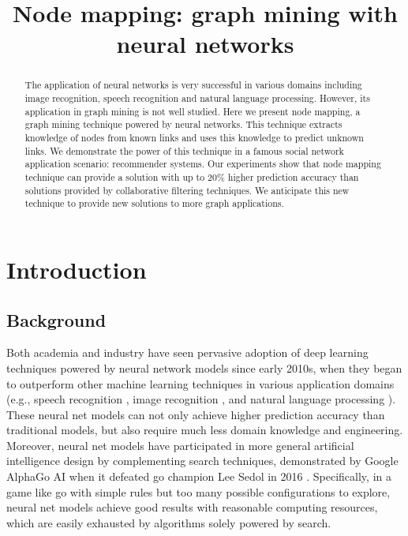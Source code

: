 \documentclass[twocolumn]{article}
\begin{document}
\lstset{language=python, tabsize=4}
\title{Node mapping: graph mining with neural networks}
\maketitle

\begin{abstract}
	The application of neural networks is very successful in various domains 
	including image recognition, speech recognition and natural language 
	processing.
	However, its application in graph mining is not well studied.
	Here we present node mapping, a graph mining technique powered by neural 
	networks.
	This technique extracts knowledge of nodes from known links and uses this 
	knowledge to predict unknown links.
	We demonstrate the power of this technique in a famous social network 
	application scenario: recommender systems.
	Our experiments show that node mapping technique can provide a 
	solution with up to 20\% higher prediction accuracy than solutions provided 
	by collaborative filtering techniques.
	We anticipate this new technique to provide new solutions to more graph 
	applications.
\end{abstract}

\section{Introduction}

\subsection{Background}
Both academia and industry have seen pervasive adoption of deep learning 
techniques powered by neural network models since early 2010s,
when they began to outperform other machine learning techniques in various 
application domains (e.g., speech recognition \cite{hannun2014deep}, image 
recognition \cite{simonyan2014very}, and natural language processing 
\cite{yao2013recurrent}).
These neural net models can not only achieve higher prediction accuracy than 
traditional models,
but also require much less domain knowledge and engineering.
Moreover, neural net models have participated in more general artificial 
intelligence design by complementing search techniques, 
demonstrated by Google AlphaGo AI when it defeated go champion Lee Sedol in 
2016 \cite{silver2016mastering}.
Specifically, in a game like go with simple rules but too many possible 
configurations to explore,
neural net models achieve good results with reasonable computing resources, 
which are easily exhausted by algorithms solely powered by search.
\end{document}
